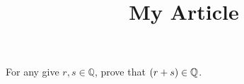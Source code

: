 \documentclass{article}
\begin{document}
\title{My Article}
\maketitle

For any give $r, s \in \mathbb Q$, prove that ${ \left(r+s\right) } \in \mathbb Q$.


\begin{align*}

\end{align*}
\end{document}
